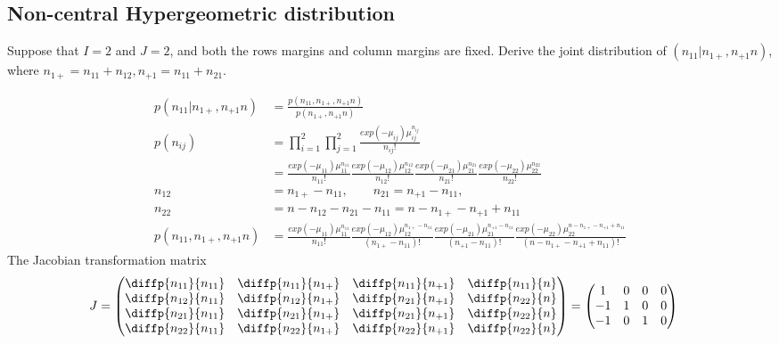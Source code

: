 \documentclass[11pt]{article} %
\begin{document}
\begin{itemize}
\subsection{Non-central Hypergeometric distribution}	
Suppose that $I=2$ and $J=2$, and both the rows margins and column margins are fixed. Derive the joint distribution of $(n_{11}|n_{1+}, n_{+1} n)$, where $n_{1+} = n_{11} + n_{12}, n_{+1} = n_{11}+ n_{21}$.

\begin{align*}
	p(n_{11}|n_{1+}, n_{+1} n) &= \frac{p(n_{11}, n_{1+}, n_{+1} n)}{p(n_{1+}, n_{+1} n)}\\
		p(n_{ij}) &= \prod_{i=1}^2 \prod_{j=1}^2 \frac{exp(-\mu_{ij}) \mu_{ij}^{n_{ij}}}{n_{ij}!} \\
		&= \frac{exp(-\mu_{11})\mu_{11}^{n_{11}} }{n_{11}!} \frac{exp(-\mu_{12})\mu_{12}^{n_{12}}}{n_{12}!} \frac{exp(-\mu_{21})\mu_{21}^{n_{21}}}{n_{21}!} \frac{exp(-\mu_{22})\mu_{22}^{n_{22}}}{n_{22}!}\\
		n_{12} &= n_{1+} - n_{11}, \qquad n_{21} = n_{+1} - n_{11}, \\ n_{22} &= n - n_{12} - n_{21} - n_{11} = n- n_{1+} - n_{+1} + n_{11}\\
		p(n_{11}, n_{1+}, n_{+1} n) &= \frac{exp(-\mu_{11})\mu_{11}^{n_{11}} }{n_{11}!} \frac{exp(-\mu_{12})\mu_{12}^{n_{1+} - n_{11}}}{(n_{1+} - n_{11})!} \frac{exp(-\mu_{21})\mu_{21}^{n_{+1} - n_{11}}}{(n_{+1} - n_{11})!} \frac{exp(-\mu_{22})\mu_{22}^{n- n_{1+} - n_{+1} + n_{11}}}{(n- n_{1+} - n_{+1} + n_{11})!}
\end{align*}	
The Jacobian transformation matrix 
\begin{align*}
	J &=  \begin{pmatrix}
	\diffp{{n_{11}}}{{n_{11}}} & \diffp{{n_{11}}}{{n_{1+}}} & \diffp{{n_{11}}}{{n_{+1}}} & \diffp{{n_{11}}}{{n}}\\
	\diffp{{n_{12}}}{{n_{11}}} & \diffp{{n_{12}}}{{n_{1+}}} & \diffp{{n_{21}}}{{n_{+1}}} & \diffp{{n_{22}}}{{n}}\\
	\diffp{{n_{21}}}{{n_{11}}} & \diffp{{n_{21}}}{{n_{1+}}} & \diffp{{n_{21}}}{{n_{+1}}} & \diffp{{n_{22}}}{{n}}\\
	\diffp{{n_{22}}}{{n_{11}}} & \diffp{{n_{22}}}{{n_{1+}}} & \diffp{{n_{22}}}{{n_{+1}}} & \diffp{{n_{22}}}{{n}} \\
\end{pmatrix}= \begin{pmatrix}
1 & 0 & 0 & 0\\
-1 & 1 & 0 & 0\\
-1 & 0 & 1 & 0\\

\end{pmatrix}
\end{align*}
\end{itemize}
\end{document}
